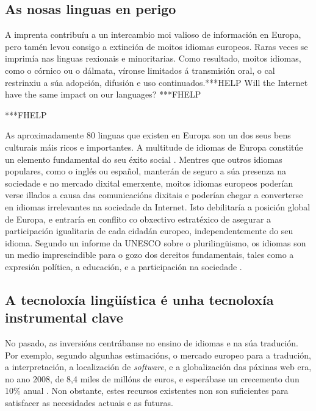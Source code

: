 \begin{multicols}{2}
\subsection{As nosas linguas en perigo}

    A imprenta contribuíu a un intercambio moi valioso de información en Europa, pero tamén levou consigo a extinción de moitos idiomas europeos. Raras veces se imprimía nas linguas rexionais e minoritarias. Como resultado, moitos idiomas, como o córnico ou o dálmata, víronse limitados á transmisión oral, o cal restrinxiu a súa adopción, difusión e uso continuados.***HELP Will the Internet have the same impact on our languages? ***FHELP

***FHELP

As aproximadamente 80 linguas que existen en Europa son un dos seus bens culturais máis ricos e importantes. A multitude de idiomas de Europa constitúe un elemento fundamental do seu éxito social \cite{GAL-Nota2}. Mentres que outros idiomas populares, como o inglés ou español, manterán de seguro a súa presenza na sociedade e no mercado dixital emerxente, moitos idiomas europeos poderían verse illados a causa das comunicacións dixitais e poderían chegar a converterse en idiomas irrelevantes na sociedade da Internet. Isto debilitaría a posición global de Europa, e entraría en conflito co obxectivo estratéxico de asegurar a participación igualitaria de cada cidadán europeo, independentemente do seu idioma. Segundo un informe da UNESCO sobre o plurilingüismo, os idiomas son un medio imprescindible para o gozo dos dereitos fundamentais, tales como a expresión política, a educación, e a participación na sociedade \cite{GAL-Nota3}.

\subsection{A tecnoloxía lingüística é unha tecnoloxía instrumental clave}

   No pasado, as inversións centrábanse no ensino de idiomas e na súa tradución. Por exemplo, segundo algunhas estimacións, o mercado europeo para a tradución, a interpretación, a localización de \textit{software}, e a globalización das páxinas web era, no ano 2008, de 8,4 miles de millóns de euros, e esperábase un crecemento dun 10\% anual \cite{GAL-Nota4}.  Non obstante, estes recursos existentes non son suficientes para satisfacer as necesidades actuais e as futuras. 


\end{multicols}
